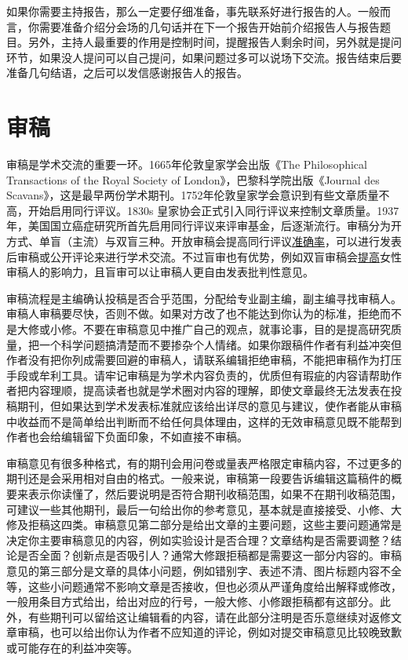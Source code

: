 \documentclass[]{tufte-book}
\begin{document}
如果你需要主持报告，那么一定要仔细准备，事先联系好进行报告的人。一般而言，你需要准备介绍分会场的几句话并在下一个报告开始前介绍报告人与报告题目。另外，主持人最重要的作用是控制时间，提醒报告人剩余时间，另外就是提问环节，如果没人提问可以自己提问，如果问题过多可以说场下交流。报告结束后要准备几句结语，之后可以发信感谢报告人的报告。

\hypertarget{ux5ba1ux7a3f}{%
\section{审稿}\label{ux5ba1ux7a3f}}

审稿是学术交流的重要一环。1665年伦敦皇家学会出版《The Philosophical Transactions of the Royal Society of London》，巴黎科学院出版《Journal des Scavans》，这是最早两份学术期刊。1752年伦敦皇家学会意识到有些文章质量不高，开始启用同行评议。1830s 皇家协会正式引入同行评议来控制文章质量。1937年，美国国立癌症研究所首先启用同行评议来评审基金，后逐渐流行。审稿分为开方式、单盲（主流）与双盲三种。开放审稿会提高同行评议\href{https://doi.org/10.1371/journal.pone.0026895}{准确率}，可以进行发表后审稿或公开评论来进行学术交流。不过盲审也有优势，例如双盲审稿会\href{https://www.sciencedirect.com/science/article/pii/S0169534707002704}{提高}女性审稿人的影响力，且盲审可以让审稿人更自由发表批判性意见。

审稿流程是主编确认投稿是否合乎范围，分配给专业副主编，副主编寻找审稿人。审稿人审稿要尽快，否则不做。如果对方改了也不能达到你认为的标准，拒绝而不是大修或小修。不要在审稿意见中推广自己的观点，就事论事，目的是提高研究质量，把一个科学问题搞清楚而不要掺杂个人情绪。如果你跟稿件作者有利益冲突但作者没有把你列成需要回避的审稿人，请联系编辑拒绝审稿，不能把审稿作为打压手段或牟利工具。请牢记审稿是为学术内容负责的，优质但有瑕疵的内容请帮助作者把内容理顺，提高读者也就是学术圈对内容的理解，即使文章最终无法发表在投稿期刊，但如果达到学术发表标准就应该给出详尽的意见与建议，使作者能从审稿中收益而不是简单给出判断而不给任何具体理由，这样的无效审稿意见既不能帮到作者也会给编辑留下负面印象，不如直接不审稿。

审稿意见有很多种格式，有的期刊会用问卷或量表严格限定审稿内容，不过更多的期刊还是会采用相对自由的格式。一般来说，审稿第一段要告诉编辑这篇稿件的概要来表示你读懂了，然后要说明是否符合期刊收稿范围，如果不在期刊收稿范围，可建议一些其他期刊，最后一句给出你的参考意见，基本就是直接接受、小修、大修及拒稿这四类。审稿意见第二部分是给出文章的主要问题，这些主要问题通常是决定你主要审稿意见的内容，例如实验设计是否合理？文章结构是否需要调整？结论是否全面？创新点是否吸引人？通常大修跟拒稿都是需要这一部分内容的。审稿意见的第三部分是文章的具体小问题，例如错别字、表述不清、图片标题内容不全等，这些小问题通常不影响文章是否接收，但也必须从严谨角度给出解释或修改，一般用条目方式给出，给出对应的行号，一般大修、小修跟拒稿都有这部分。此外，有些期刊可以留给这让编辑看的内容，请在此部分注明是否乐意继续对返修文章审稿，也可以给出你认为作者不应知道的评论，例如对提交审稿意见比较晚致歉或可能存在的利益冲突等。
\end{document}
